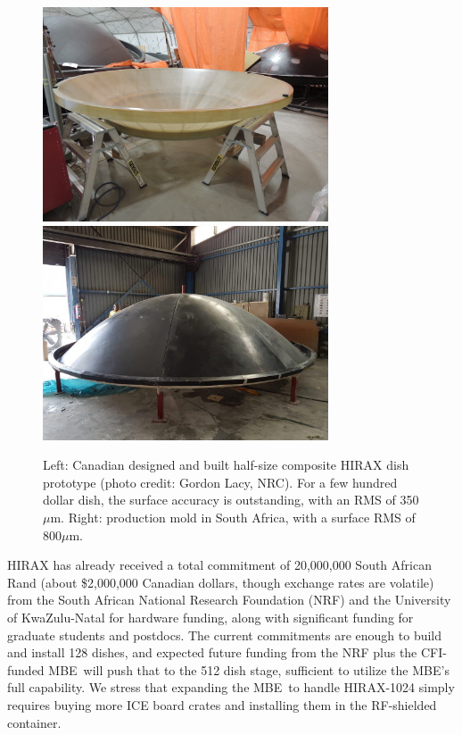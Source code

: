 \documentclass[letterpaper,11pt,preprint]{aastex}
\newcommand{\mbe}{{\rm MBE}}
\begin{document}
\begin{figure}[tbh]
  \includegraphics[height=2.5in]{3m_dish.jpg}
  \includegraphics[height=2.5in]{mms_mold.jpg}
\caption{\small Left:  Canadian designed and built half-size composite
  HIRAX dish prototype (photo credit: Gordon Lacy, NRC).  For a few
  hundred dollar dish, the surface accuracy is outstanding, with an
  RMS of 350$\mu$m.  Right: production mold in South Africa, with a
  surface RMS of 800$\mu$m.
  \label{fig:hirax_dishes}
}
\end{figure}


HIRAX has already received a total commitment of 20,000,000 South
African Rand (about \$2,000,000 Canadian dollars, though exchange
rates are volatile) from the South African National Research
Foundation (NRF) and the University of KwaZulu-Natal for hardware
funding, along with significant funding for graduate students and
postdocs.  The current commitments are enough to build and install 128
dishes, and expected future funding from the NRF plus the CFI-funded
\mbe\ will push that to the 512 dish stage, sufficient to utilize the
\mbe's full capability.  We stress that expanding the \mbe\ to handle
HIRAX-1024 simply requires buying more ICE board crates and installing
them in the RF-shielded container.
\end{document}
